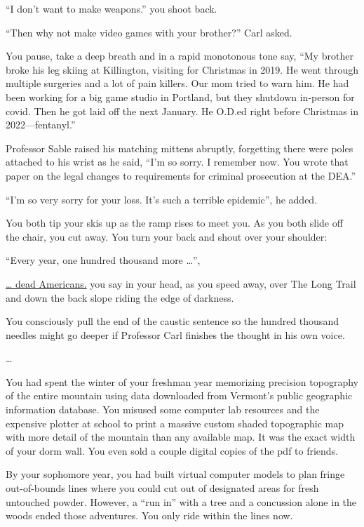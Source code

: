 \documentclass[17pt, twoside, a5paper, openright, extrafontsizes]{memoir}
\renewcommand{\emph}[1]{\ul{#1}}
\begin{document}
``I don't want to make weapons.'' you shoot back.

``Then why not make video games with your brother?'' Carl asked.

You pause, take a deep breath and in a rapid monotonous tone say, ``My
brother broke his leg skiing at Killington, visiting for Christmas in
2019. He went through multiple surgeries and a lot of pain killers. Our
mom tried to warn him. He had been working for a big game studio in
Portland, but they shutdown in-person for covid. Then he got laid off
the next January. He O.D.ed right before Christmas in 2022---fentanyl.''

Professor Sable raised his matching mittens abruptly, forgetting there
were poles attached to his wrist as he said, ``I'm so sorry. I remember
now. You wrote that paper on the legal changes to requirements for
criminal prosecution at the DEA.''

``I'm so very sorry for your loss. It's such a terrible epidemic'', he
added.

You both tip your skis up as the ramp rises to meet you. As you both
slide off the chair, you cut away. You turn your back and shout over
your shoulder:

``Every year, one hundred thousand more \ldots{}'',

\emph{\ldots{} dead Americans.} you say in your head, as you speed away,
over The Long Trail and down the back slope riding the edge of darkness.

You consciously pull the end of the caustic sentence so the hundred
thousand needles might go deeper if Professor Carl finishes the thought
in his own voice.

\ldots{}

You had spent the winter of your freshman year memorizing precision
topography of the entire mountain using data downloaded from Vermont's
public geographic information database. You misused some computer lab
resources and the expensive plotter at school to print a massive custom
shaded topographic map with more detail of the mountain than any
available map. It was the exact width of your dorm wall. You even sold a
couple digital copies of the pdf to friends.

By your sophomore year, you had built virtual computer models to plan
fringe out-of-bounds lines where you could cut out of designated areas
for fresh untouched powder. However, a ``run in'' with a tree and a
concussion alone in the woods ended those adventures. You only ride
within the lines now.
\end{document}
